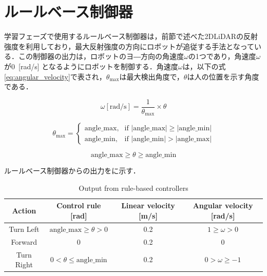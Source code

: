 
\section{ルールベース制御器}

  学習フェーズで使用するルールベース制御器は，前節で述べた2DLiDARの反射強度を利用しており，最大反射強度の方向にロボットが追従する手法となっている．この制御器の出力は，ロボットのヨ―方向の角速度$\omega$の1つであり，角速度$\omega$が0 \,[rad/s] となるようにロボットを制御する．角速度$\omega$は，以下の式\eqref{eq:angular_velocity}で表され，$\theta_{\text{max}}$は最大検出角度で，$\theta$は人の位置を示す角度である．

  \begin{equation}
    \omega[\text{rad/s}] = \frac{1}{\theta_{\text{max}}} \times \theta
    \label{eq:angular_velocity}
    \end{equation}

  \begin{equation*}
    \theta_{\text{max}} = 
    \begin{cases}
      \text{angle\_max}, & \text{if } |\text{angle\_max}| \geq |\text{angle\_min}| \\
      \text{angle\_min}, & \text{if } |\text{angle\_min}| > |\text{angle\_max}|
      \end{cases} 
    \end{equation*}

  \begin{equation*}
    \text{angle\_max} \geq \theta \geq \text{angle\_min}
    \label{eq:inequality}
    \end{equation*}

  ルールベース制御器からの出力をに示す．

  \begin{table}[h]
    \caption{Output from rule-based controllers}
    \label{tab:output_from_rule-based_controllers}
    \begin{tabular}{cccc}
    \hline
    Action & Control rule {[}rad{]} & Linear velocity {[}m/s{]} & Angular velocity {[}rad/s{]} \\ 
    \hline
    \hline
    Turn Left & $\text{angle\_max} \geq \theta > 0$ & 0.2 & $1 \geq \omega > 0$ \\ 
    Forward & $0$ & 0.2 & $0$ \\ 
    Turn Right & $0 < \theta \leq \text{angle\_min}$ & 0.2 & $0 > \omega \geq -1$ \\ 
    \hline
    \end{tabular}
    \end{table}

